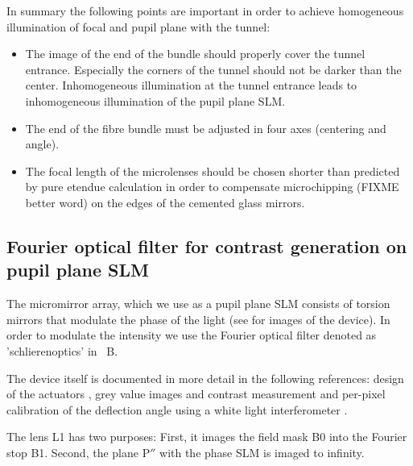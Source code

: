 In summary the following points are important in order to achieve
homogeneous illumination of focal and pupil plane with the tunnel:
\begin{itemize}
\item The image of the end of the bundle should properly cover the
  tunnel entrance. Especially the corners of the tunnel should not be
  darker than the center. Inhomogeneous illumination at the tunnel
  entrance leads to inhomogeneous illumination of the pupil plane SLM.
\item The end of the fibre bundle must be adjusted in four axes
  (centering and angle).
\item The focal length of the microlenses should be chosen shorter
  than predicted by pure etendue calculation in order to compensate
  microchipping (FIXME better word) on the edges of the cemented glass
  mirrors.
\end{itemize}

\subsection{Fourier optical filter for contrast generation on pupil
  plane SLM}
\label{ref:mma}
The micromirror array, which we use as a pupil plane SLM consists of
torsion mirrors that modulate the phase of the light (see
 for images of the device). In order to modulate the
intensity we use the Fourier optical filter denoted as
'schlierenoptics' in ~B.

The device itself is documented in more detail in the following
references: design of the actuators \citep{Schmidt2010}, grey value
images and contrast measurement \citep{Berndt2010} and per-pixel
calibration of the deflection angle using a white light interferometer
\citep{Berndt2011,Berndt2007}.


The lens L1 has two purposes: First, it images the field mask B0 into %
the Fourier stop B1. Second, the plane $\textrm{P}''$ with the phase
SLM is imaged to infinity.

